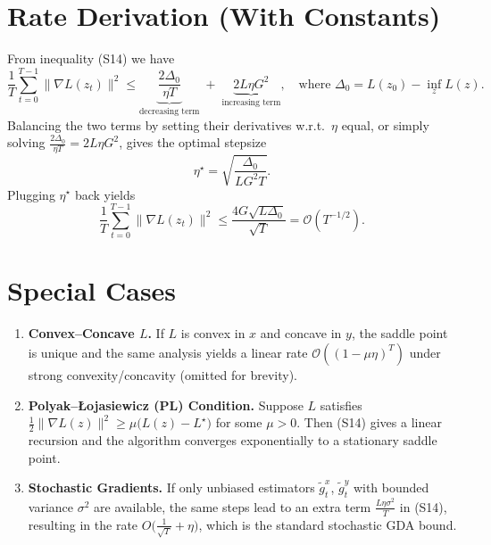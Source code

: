 \documentclass{article}
\begin{document}
\section*{Rate Derivation (With Constants)}
From inequality (S14) we have
\[
\frac{1}{T}\sum_{t=0}^{T-1}\|\nabla L(z_t)\|^{2}
\le
\underbrace{\frac{2\Delta_{0}}{\eta T}}_{\text{decreasing term}}
\;+\;
\underbrace{2L\eta G^{2}}_{\text{increasing term}},
\quad\text{where }\Delta_{0}=L(z_0)-\inf_{z}L(z).
\]
Balancing the two terms by setting their derivatives w.r.t.\ $\eta$ equal,
or simply solving $\frac{2\Delta_{0}}{\eta T}=2L\eta G^{2}$,
gives the optimal stepsize
\[
\eta^{\star}= \sqrt{\frac{\Delta_{0}}{L G^{2} T}} .
\]
Plugging $\eta^{\star}$ back yields
\[
\frac{1}{T}\sum_{t=0}^{T-1}\|\nabla L(z_t)\|^{2}
\le
\frac{4G\sqrt{L\Delta_{0}}}{\sqrt{T}}
= \mathcal{O}\!\left(T^{-1/2}\right).
\]

\section*{Special Cases}
\begin{enumerate}[label=\alph*.]
\item \textbf{Convex–Concave $L$.}  If $L$ is convex in $x$ and concave in $y$, the
saddle point is unique and the same analysis yields a linear rate
$\mathcal{O}((1-\mu\eta)^{T})$ under strong convexity/concavity (omitted for brevity).

\item \textbf{Polyak–Łojasiewicz (PL) Condition.}  Suppose $L$ satisfies
$\frac12\|\nabla L(z)\|^{2}\ge \mu\big(L(z)-L^{\star}\big)$ for some $\mu>0$.
Then (S14) gives a linear recursion and the algorithm converges exponentially
to a stationary saddle point.

\item \textbf{Stochastic Gradients.}  If only unbiased estimators
$\tilde{g}^{x}_t$, $\tilde{g}^{y}_t$ with bounded variance $\sigma^{2}$ are available,
the same steps lead to an extra term $ \frac{L\eta\sigma^{2}}{T}$ in (S14),
resulting in the rate $O\big(\frac{1}{\sqrt{T}}+\eta\big)$, which is the standard
stochastic GDA bound.
\end{enumerate}

\end{document}
